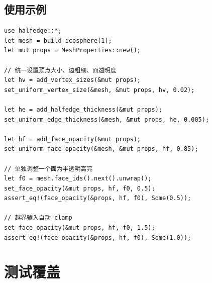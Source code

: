 \documentclass[11pt,a4paper]{article}
\begin{document}
\subsection{使用示例}

\begin{lstlisting}
use halfedge::*;
let mesh = build_icosphere(1);
let mut props = MeshProperties::new();

// 统一设置顶点大小、边粗细、面透明度
let hv = add_vertex_sizes(&mut props);
set_uniform_vertex_size(&mesh, &mut props, hv, 0.02);

let he = add_halfedge_thickness(&mut props);
set_uniform_edge_thickness(&mesh, &mut props, he, 0.005);

let hf = add_face_opacity(&mut props);
set_uniform_face_opacity(&mesh, &mut props, hf, 0.85);

// 单独调整一个面为半透明高亮
let f0 = mesh.face_ids().next().unwrap();
set_face_opacity(&mut props, hf, f0, 0.5);
assert_eq!(face_opacity(&props, hf, f0), Some(0.5));

// 越界输入自动 clamp
set_face_opacity(&mut props, hf, f0, 1.5);
assert_eq!(face_opacity(&props, hf, f0), Some(1.0));
\end{lstlisting}

\section{测试覆盖}
\end{document}
